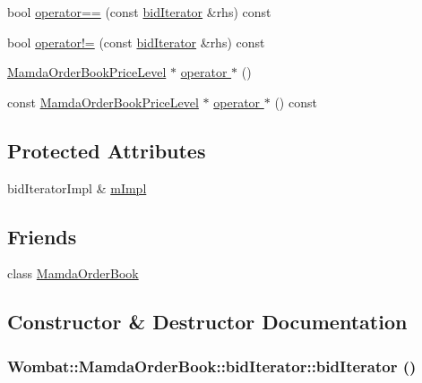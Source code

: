 \begin{CompactItemize}
\item 
bool \hyperlink{classWombat_1_1MamdaOrderBook_1_1bidIterator_c1bcf4b74ee556e20ed659d62e115fe9}{operator==} (const \hyperlink{classWombat_1_1MamdaOrderBook_1_1bidIterator}{bid\-Iterator} \&rhs) const 
\item 
bool \hyperlink{classWombat_1_1MamdaOrderBook_1_1bidIterator_e95f822afd94cc8b6ecea297f165ce3e}{operator!=} (const \hyperlink{classWombat_1_1MamdaOrderBook_1_1bidIterator}{bid\-Iterator} \&rhs) const 
\item 
\hyperlink{classWombat_1_1MamdaOrderBookPriceLevel}{Mamda\-Order\-Book\-Price\-Level} $\ast$ \hyperlink{classWombat_1_1MamdaOrderBook_1_1bidIterator_159db877b3d19320feed17a490beae4a}{operator $\ast$} ()
\item 
const \hyperlink{classWombat_1_1MamdaOrderBookPriceLevel}{Mamda\-Order\-Book\-Price\-Level} $\ast$ \hyperlink{classWombat_1_1MamdaOrderBook_1_1bidIterator_b8780fda39a421ff523483b7599e7427}{operator $\ast$} () const 
\end{CompactItemize}
\subsection*{Protected Attributes}
\begin{CompactItemize}
\item 
bid\-Iterator\-Impl \& \hyperlink{classWombat_1_1MamdaOrderBook_1_1bidIterator_93880f0527fcd1904174ae11c70b9d4d}{m\-Impl}
\end{CompactItemize}
\subsection*{Friends}
\begin{CompactItemize}
\item 
class \hyperlink{classWombat_1_1MamdaOrderBook_1_1bidIterator_51cb271c9914c74f99c60cb638c26be7}{Mamda\-Order\-Book}
\end{CompactItemize}


\subsection{Constructor \& Destructor Documentation}
\hypertarget{classWombat_1_1MamdaOrderBook_1_1bidIterator_a227c7c17aedfc6f7091c9b6e7a1b8e6}{
\subsubsection[bidIterator]{\setlength{\rightskip}{0pt plus 5cm}Wombat::Mamda\-Order\-Book::bid\-Iterator::bid\-Iterator ()}}
\label{classWombat_1_1MamdaOrderBook_1_1bidIterator_a227c7c17aedfc6f7091c9b6e7a1b8e6}


